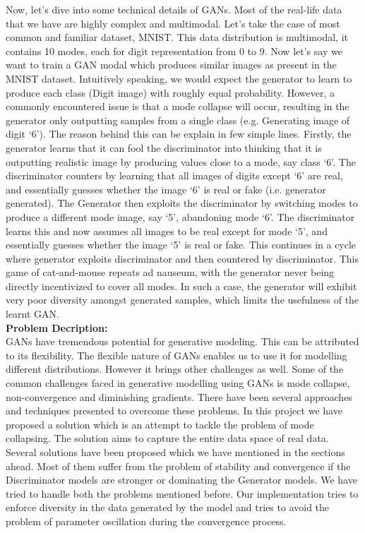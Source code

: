 \documentclass[12pt]{article}
\begin{document}
Now, let’s dive into some technical details of GANs. Most of the real-life data that we have are highly complex and multimodal. Let’s take the case of most common and familiar dataset, MNIST. This data distribution is multimodal, it contains 10 modes, each for digit representation from 0 to 9. Now let’s say we want to train a GAN modal which produces similar images as present in the MNIST dataset.  Intuitively speaking, we would expect the generator to learn to produce each class (Digit image) with roughly equal probability. However, a commonly encountered issue is that a mode collapse will occur, resulting in the generator only outputting samples from a single class (e.g. Generating image of digit ‘6’). The reason behind this can be explain in few simple lines. Firstly, the generator learns that it can fool the discriminator into thinking that it is outputting realistic image by producing values close to a mode, say class ‘6’. The discriminator counters by learning that all images of digits except ‘6’ are real, and essentially guesses whether the image ‘6’ is real or fake (i.e. generator generated). The Generator then exploits the discriminator by switching modes to produce a different mode image, say ‘5’, abandoning mode ‘6’. The discriminator learns this and now assumes all images to be real except for mode ‘5’, and essentially guesses whether the image ‘5’ is real or fake. This continues in a cycle where generator exploits discriminator and then countered by discriminator. This game of cat-and-mouse repeats ad nauseum, with the generator never being directly incentivized to cover all modes. In such a case, the generator will exhibit very poor diversity amongst generated samples, which limits the usefulness of the learnt GAN.\\

\noindent \textbf{Problem Decription:}\\

GANs have tremendous potential for generative modeling. This can be attributed to its flexibility. The flexible nature of GANs enables us to use it for modelling different distributions. However it brings other challenges as well. Some of the common challenges faced in generative modelling using GANs is mode collapse, non-convergence and diminishing gradients. There have been several approaches and techniques presented to overcome these problems. In this project we have proposed a solution which is an attempt to tackle the problem of mode collapsing. The solution aims to capture the entire data space of real data. Several solutions have been proposed which we have mentioned in the sections ahead. Most of them suffer from the problem of stability and convergence if the Discriminator models are stronger or dominating the Generator models. We have tried to handle both the problems mentioned before. Our implementation tries to enforce diversity in the data generated by the model and tries to avoid the problem of parameter oscillation during the convergence process.\\
\end{document}
